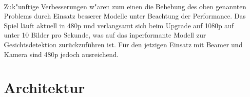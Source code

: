 \documentclass[12pt]{article}
\begin{document}
\paragraph{}
Zuk"unftige Verbesserungen w"aren zum einen die Behebung des oben genannten Problems
durch Einsatz besserer Modelle unter Beachtung der Performance. Das Spiel läuft aktuell
in 480p und verlangsamt sich beim Upgrade auf 1080p auf unter 10 Bilder pro Sekunde,
was auf das inperformante Modell zur Gesichtsdetektion zurückzuführen ist.
Für den jetzigen Einsatz mit Beamer und Kamera sind 480p jedoch ausreichend.
\section{Architektur}
\end{document}
